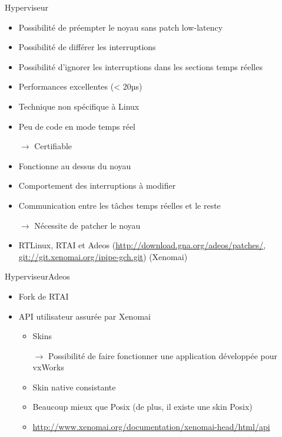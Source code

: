 \begin{frame}[fagile]{Hyperviseur}
  \begin{itemize}
  \item Possibilité de préempter le noyau sans patch low-latency
  \item Possibilité de différer les interruptions
  \item  Possibilité  d'ignorer les  interruptions  dans les  sections
    temps réelles
  \item Performances excellentes (< 20µs)
  \item Technique non spécifique à Linux
  \item Peu de code en mode temps réel
  \item[$\to$] Certifiable

  \item Fonctionne au dessus du noyau
  \item Comportement des interruptions à modifier
  \item Communication entre les tâches temps réelles et le reste
  \item[$\to$] Nécessite de patcher le noyau
  \item           RTLinux,           RTAI           et           Adeos
    (\url{http://download.gna.org/adeos/patches/},
    \url{git://git.xenomai.org/ipipe-gch.git}) (Xenomai)
  \end{itemize}
\end{frame}

\begin{frame}{Hyperviseur}{Adeos}
  \begin{itemize}
    \item Fork de RTAI
    \item API utilisateur assurée par Xenomai
    \begin{itemize}
      \item Skins
      \item[$\to$]  Possibilité de  faire fonctionner  une application
        développée pour vxWorks
      \item Skin native consistante
      \item Beaucoup mieux que Posix (de plus, il existe une skin Posix)
      \item \url{http://www.xenomai.org/documentation/xenomai-head/html/api}
    \end{itemize}
  \end{itemize}
\end{frame}

